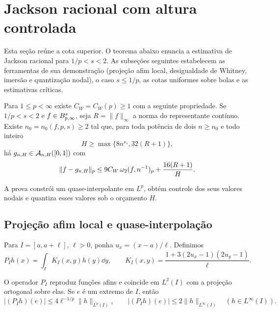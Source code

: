 \documentclass[12pt,a4paper]{article}
\begin{document}
\section{Jackson racional com altura controlada}
\label{lp:sec:program}

Esta seção reúne a cota superior. O teorema abaixo enuncia a estimativa de Jackson racional para $1/p<s<2$. As subseções seguintes estabelecem as ferramentas de sua demonstração (projeção afim local, desigualdade de Whitney, imersão e quantização nodal), o caso $s\le1/p$, as cotas uniformes sobre bolas e as estimativas críticas.

\begin{teorema}
\label{lp:hyp:jackson}
Para $1\le p<\infty$ existe $C_W=C_W(p)\ge1$ com a seguinte propriedade. Se $1/p<s<2$ e $f\in B^{s}_{p,\infty}$, seja $R=\|f\|_\infty$ a norma do representante contínuo. Existe $n_0=n_0(f,p,s)\ge2$ tal que, para toda potência de dois $n\ge n_0$ e todo inteiro
\begin{equation}
 H\ge\max\{8n^{\nu_s},32(R+1)\},
 \label{lp:eq:height-threshold}
\end{equation}
há $g_{n,H}\in\mathcal A_{n,H}([0,1])$ com
\begin{equation}
 \|f-g_{n,H}\|_p\le9C_W\,\omega_2(f,n^{-1})_{p}+\frac{16(R+1)}{H}.
 \label{lp:eq:jackson-p}
\end{equation}
\end{teorema}

A prova constrói um quase-interpolante em $L^p$, obtém controle dos seus valores nodais e quantiza esses valores sob o orçamento $H$.

\subsection{Projeção afim local e quase-interpolação}

Para $I=[a,a+\ell]$, $\ell>0$, ponha $u_x=(x-a)/\ell$. Definimos
\[
 P_I h(x)=\int_I K_I(x,y)h(y)\dd y,
 \qquad
 K_I(x,y)=\frac{1+3(2u_x-1)(2u_y-1)}{\ell}.
\]

\begin{lema}
\label{lp:lem:projection}
O operador $P_I$ reproduz funções afins e coincide em $L^2(I)$ com a projeção ortogonal sobre elas. Se $e$ é um extremo de $I$, então
\begin{equation}
 |(P_I h)(e)|\le4\ell^{-1/p}\|h\|_{L^p(I)},\qquad
 |(P_I h)(e)|\le2\|h\|_{L^\infty(I)}\quad(h\in L^\infty(I)).
 \label{lp:eq:projection-bounds}
\end{equation}
\end{lema}
\end{document}
